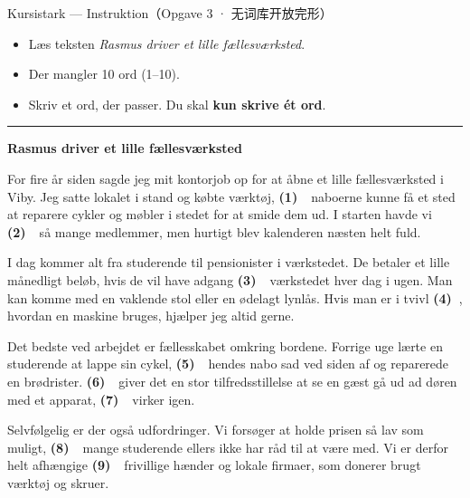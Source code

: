\begin{emailbox}{Kursistark --- Instruktion（Opgave 3 · 无词库开放完形）}
\begin{itemize}
  \item Læs teksten \textit{Rasmus driver et lille fællesværksted}.
  \item Der mangler 10 ord (1--10).
  \item Skriv et ord, der passer. Du skal \textbf{kun skrive ét ord}.
\end{itemize}

\vspace{0.35em}
\hrule
\vspace{0.45em}

\textbf{\color{NCDNavy}Rasmus driver et lille fællesværksted}

\vspace{0.3em}
For fire år siden sagde jeg mit kontorjob op for at åbne et lille fællesværksted i Viby. Jeg satte lokalet i stand og købte værktøj, \textbf{(1)\ \underline{\hspace{2.1cm}}}\ naboerne kunne få et sted at reparere cykler og møbler i stedet for at smide dem ud. I starten havde vi \textbf{(2)\ \underline{\hspace{2.1cm}}}\ så mange medlemmer, men hurtigt blev kalenderen næsten helt fuld.

\vspace{0.25em}
I dag kommer alt fra studerende til pensionister i værkstedet. De betaler et lille månedligt beløb, hvis de vil have adgang \textbf{(3)\ \underline{\hspace{2.1cm}}}\ værkstedet hver dag i ugen. Man kan komme med en vaklende stol eller en ødelagt lynlås. Hvis man er i tvivl \textbf{(4)\ \underline{\hspace{2.1cm}}}, hvordan en maskine bruges, hjælper jeg altid gerne.

\vspace{0.25em}
Det bedste ved arbejdet er fællesskabet omkring bordene. Forrige uge lærte en studerende at lappe sin cykel, \textbf{(5)\ \underline{\hspace{2.1cm}}}\ hendes nabo sad ved siden af og reparerede en brødrister. \textbf{(6)\ \underline{\hspace{2.1cm}}}\ giver det en stor tilfredsstillelse at se en gæst gå ud ad døren med et apparat, \textbf{(7)\ \underline{\hspace{2.1cm}}}\ virker igen.

\vspace{0.25em}
Selvfølgelig er der også udfordringer. Vi forsøger at holde prisen så lav som muligt, \textbf{(8)\ \underline{\hspace{2.1cm}}}\ mange studerende ellers ikke har råd til at være med. Vi er derfor helt afhængige \textbf{(9)\ \underline{\hspace{2.1cm}}}\ frivillige hænder og lokale firmaer, som donerer brugt værktøj og skruer.


\end{emailbox}
